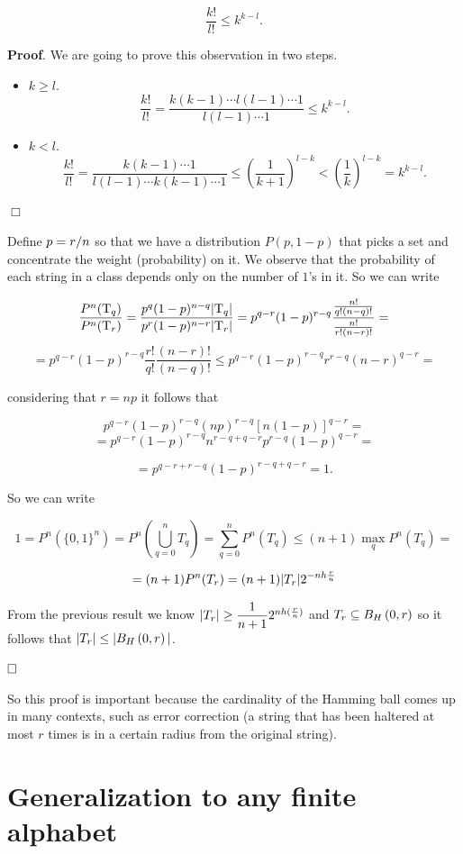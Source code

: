 \begin{obs}
	$$\dfrac{k!}{l!} \leq k^{k-l}.$$
\end{obs}

\noindent\textbf{Proof}. We are going to prove this observation in two steps.
\begin{itemize}
	\item $k \geq l$. 
	$$\dfrac{k!}{l!} = \dfrac{k(k-1) \cdots l(l -1) \cdots 1}{l(l -1) \cdots 1} \leq k^{k-l}.$$
	
	\item $k < l$.
	$$\dfrac{k!}{l!} = \dfrac{k(k-1) \cdots 1}{l(l -1) \cdots k(k-1) \cdots 1} \leq \left(\dfrac{1}{k+1}\right)^{l-k} < \left(\dfrac{1}{k}\right)^{l-k} = k^{k-l}.$$
\end{itemize}
\hfill$\Box$

Define $p = {r}/{n}$  so that we have a distribution $P(p, 1-p)$ that picks a set and concentrate the weight (probability) on it. We observe that the probability of each string in a class depends only on the number of $1$'s in it. So we can write

\[\dfrac{P^n(\mathrm{T}_q)}{P^n(\mathrm{T}_r)} = \dfrac{p^q(1-p)^{n-q}|\mathrm{T}_q|}{p^r(1-p)^{n-r}|\mathrm{T}_r|} = p^{q-r}(1-p)^{r-q} \dfrac{\frac{n!}{q!(n-q)!}}{\frac{n!}{r!(n-r)!}} = \]
\[ = p^{q-r}(1-p)^{r-q}\dfrac{r!}{q!}\dfrac{(n-r)!}{(n-q)!} \leq p^{q-r}(1-p)^{r-q}r^{r-q}(n-r)^{q-r} = \]

considering that $r = np$ it follows that

\[p^{q-r}(1-p)^{r-q} (np)^{r-q}[n(1-p)]^{q-r}= \] \[ = p^{q-r}(1-p)^{r-q}n^{r-q+q-r}p^{r-q}(1-p)^{q-r} = \]

\[ = p^{q-r + r-q}(1-p)^{r-q+q-r} = 1.\]

So we can write

\[1 = P^n(\{0,1\}^n) = P^n\left(\bigcup_{q=0}^nT_q\right) = \sum_{q=0}^nP^n(T_q)\leq(n+1) \max_qP^n(T_q) = \]

\[=(n+1)P^n(T_r) = (n + 1)|T_r|2^{-nh\frac{r}{n}}\]

From the previous result we know $|T_r| \geq \dfrac{1}{n+1}2^{nh(\frac{r}{n})}$ and $T_r \subseteq B_H\left(0, r\right)$ so it follows that $|T_r| \leq |B_H\left(0, r\right)|$.

$\hfill \Box$

So this proof is important because the cardinality of the Hamming ball comes up in many contexts, such as error correction (a string that has been haltered at most $r$ times is in a certain radius from the original string).

\section{Generalization to any finite alphabet}

